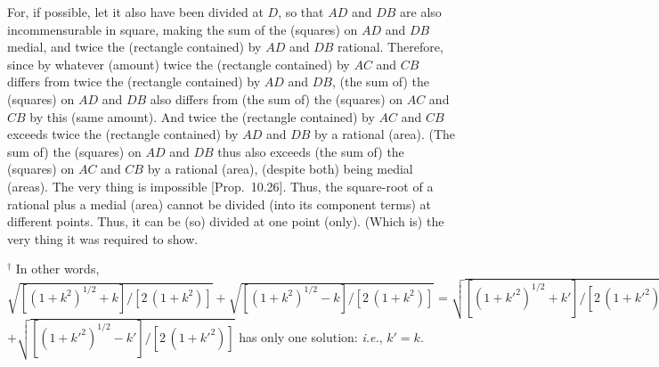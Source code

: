 \begin{Parallel}{}{}
{For, if possible, let it also have been divided at $D$, so that
$AD$ and $DB$ are also incommensurable in square, making the sum of 
the (squares) on $AD$ and $DB$ medial, and twice the (rectangle
contained) by $AD$ and $DB$ rational. Therefore, since by whatever
(amount) twice the (rectangle contained) by $AC$ and $CB$
differs from twice the (rectangle contained) by $AD$ and $DB$, (the sum of) the (squares) on  $AD$ and $DB$ also differs from (the sum of) the
(squares) on
$AC$ and $CB$ by this
(same amount). And twice the (rectangle contained) by $AC$ and $CB$
exceeds twice the (rectangle contained) by $AD$ and $DB$ by a
rational (area). (The sum of) the (squares)
on $AD$ and $DB$ thus also exceeds (the sum of) the (squares) on $AC$ and $CB$ by a rational (area),
(despite both) being medial (areas). The very thing is impossible [Prop.~10.26]. Thus, the square-root of a rational
plus a medial (area) cannot be divided (into its component terms) at different points. Thus, it
can  be (so) divided at one point (only). (Which is) the very thing it was required to
show.}
\end{Parallel}
{\footnotesize\noindent$^\dag$ In other words, $\sqrt{[(1+k^2)^{1/2}+k]/[2\,(1+k^2)]} +\sqrt{[(1+k^2)^{1/2}-k]/[2\,(1+k^2)]}=\sqrt{[(1+k'^2)^{1/2}+k']/[2\,(1+k'^2)]}$\\$ +\sqrt{[(1+k'^2)^{1/2}-k']/[2\,(1+k'^2)]}$
has only one solution: {\em i.e.}, $k'=k$.}

